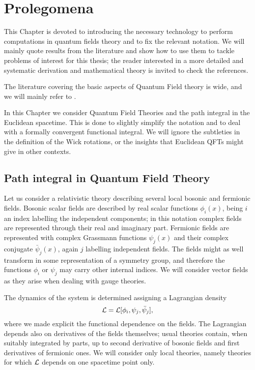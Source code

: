 

\chapter{Prolegomena}




This Chapter is devoted to introducing the necessary technology to perform computations in quantum fields theory and to fix the relevant notation. We will mainly quote results from the literature and show how to use them to tackle problems of interest for this thesis; the reader interested in a more detailed and systematic derivation and mathematical theory is invited to check the references.

The literature covering the basic aspects of Quantum Field theory is wide, and we will mainly refer to \cite{Peskin, Ram, WeinbergI, WeinbergII}.


In this Chapter we consider Quantum Field Theories and the path integral in the Euclidean spacetime. This is done to slightly simplify the notation and to deal with a formally convergent functional integral. We will ignore the subtleties in the definition of the Wick rotations, or the insights that Euclidean QFTs might give in other contexts. 



\section{Path integral in Quantum Field Theory}

Let us consider a relativistic theory describing several local bosonic and fermionic fields. Bosonic scalar fields are described by real scalar functions
\(
\phi_i(x)
\), being $i$ an index labelling the independent components; in this notation complex fields are represented through their real and imaginary part. Fermionic  fields are represented with complex Grassmann functions
\(
\psi_j(x)
\) and their complex conjugate \(
\bar \psi_j(x)
\), again $j$ labelling independent fields. The fields might as well transform in some representation of a symmetry group, and therefore the functions $\phi_i$ or $\psi_j$ may carry other internal indices. We will consider vector fields as they arise when dealing with gauge theories.

The dynamics of the system is determined assigning a Lagrangian density
\begin{equation}
{ \mathcal{L} } = { \mathcal{L} }[\phi_i, \psi_j, \bar \psi_j],
\end{equation}
where we made explicit the functional dependence on the fields. The Lagrangian  depends also on derivatives of the fields themselves; usual theories contain, when suitably integrated by parts, up to second derivative of bosonic fields and first derivatives of fermionic ones. We will consider only local theories, namely theories for which ${ \mathcal{L} }$ depends  on one spacetime point only.


